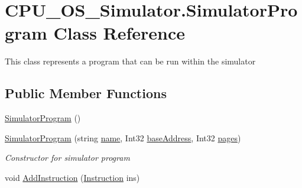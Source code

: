 \hypertarget{class_c_p_u___o_s___simulator_1_1_simulator_program}{}\section{C\+P\+U\+\_\+\+O\+S\+\_\+\+Simulator.\+Simulator\+Program Class Reference}
\label{class_c_p_u___o_s___simulator_1_1_simulator_program}


This class represents a program that can be run within the simulator  


\subsection*{Public Member Functions}
\begin{DoxyCompactItemize}
\item 
\hyperlink{class_c_p_u___o_s___simulator_1_1_simulator_program_a4fb472bc7df1427222a593c1bd6bb1e8}{Simulator\+Program} ()
\item 
\hyperlink{class_c_p_u___o_s___simulator_1_1_simulator_program_acc1a7ef72ae0772854ad7b5785af4424}{Simulator\+Program} (string \hyperlink{class_c_p_u___o_s___simulator_1_1_simulator_program_a01c3215b15e9c8e8502f35e7c8e574bd}{name}, Int32 \hyperlink{class_c_p_u___o_s___simulator_1_1_simulator_program_a71863cf3341045e483ccc52778d3ccc5}{base\+Address}, Int32 \hyperlink{class_c_p_u___o_s___simulator_1_1_simulator_program_afff0a397a56b58714cf979f5fe7b55da}{pages})
\begin{DoxyCompactList}\small\item\em Constructor for simulator program \end{DoxyCompactList}\item 
void \hyperlink{class_c_p_u___o_s___simulator_1_1_simulator_program_a1c66b407ab8e42315aa3b0358048f4b2}{Add\+Instruction} (\hyperlink{class_c_p_u___o_s___simulator_1_1_c_p_u_1_1_instruction}{Instruction} ins)
\end{DoxyCompactItemize}
